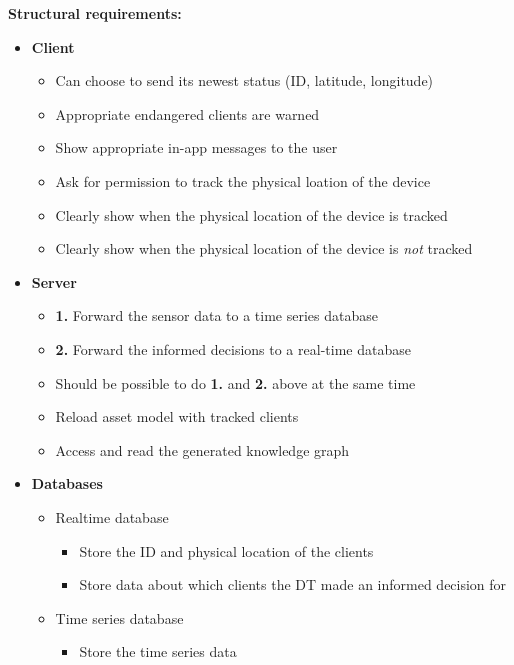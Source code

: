 \documentclass{article}
\begin{document}
\noindent\textbf{Structural requirements:}
\begin{itemize}
    \item \textbf{Client}
    \begin{itemize}
        \item Can choose to send its newest status (ID, latitude, longitude) 
        \item Appropriate endangered clients are warned 
        \item Show appropriate in-app messages to the user
        \item Ask for permission to track the physical loation of the device
        \item Clearly show when the physical location of the device is tracked
        \item Clearly show when the physical location of the device is \emph{not} tracked
    \end{itemize}
    \item \textbf{Server}
    \begin{itemize}
        \item \textbf{1.} Forward the sensor data to a time series database
        \item \textbf{2.} Forward the informed decisions to a real-time database
        \item Should be possible to do \textbf{1.} and \textbf{2.} above at the same time
        \item Reload asset model with tracked clients
        \item Access and read the generated knowledge graph
    \end{itemize}
    \item \textbf{Databases}
    \begin{itemize}
        \item Realtime database
        \begin{itemize}
            \item Store the ID and physical location of the clients
            \item Store data about which clients the DT made an informed decision for
        \end{itemize}
        \item Time series database
        \begin{itemize}
            \item Store the time series data
        \end{itemize}
    \end{itemize}

\end{itemize}
\end{document}
